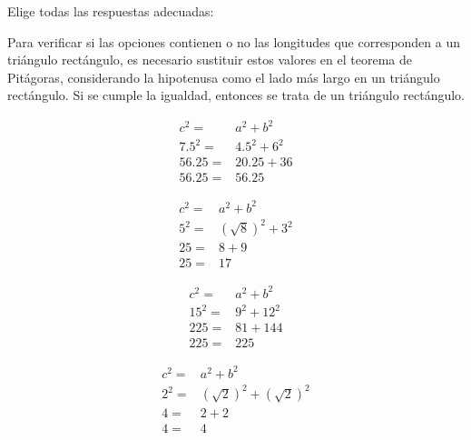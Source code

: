 Elige todas las respuestas adecuadas:
\begin{solutionbox}{6cm}
    Para verificar si las opciones contienen o no las longitudes que corresponden a un triángulo rectángulo, es necesario sustituir estos valores en el teorema de Pitágoras, considerando la hipotenusa como el lado más largo en un triángulo rectángulo. Si se cumple la igualdad, entonces se trata de un triángulo rectángulo.

    \begin{multicols}{4}
        \begin{align*}
            c^2=   & a^2+b^2   \\
            7.5^2= & 4.5^2+6^2 \\
            56.25= & 20.25+36  \\
            56.25= & 56.25
        \end{align*}

        \begin{align*}
            c^2=  & a^2+b^2            \\
            5^2 = & (\sqrt{8})^2 + 3^2 \\
            25=   & 8+9                \\
            25=   & 17
        \end{align*}

        \begin{align*}
            c^2=  & a^2+b^2  \\
            15^2= & 9^2+12^2 \\
            225=  & 81+144   \\
            225=  & 225
        \end{align*}

        \begin{align*}
            c^2= & a^2+b^2                    \\
            2^2= & (\sqrt{2})^2+ (\sqrt{2})^2 \\
            4=   & 2+2                        \\
            4=   & 4
        \end{align*}
    \end{multicols}
\end{solutionbox}